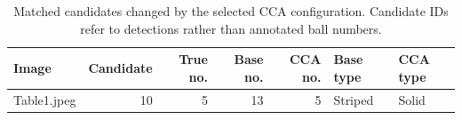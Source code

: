 \begin{table}[htbp]
\centering
\small
\caption{Matched candidates changed by the selected CCA configuration. Candidate IDs refer to detections rather than annotated ball numbers.}
\label{tab:cca-search-changes}
\begin{tabular}{lrrrrll}
\toprule
Image & Candidate & True no. & Base no. & CCA no. & Base type & CCA type \\
\midrule
Table1.jpeg & 10 & 5 & 13 & 5 & Striped & Solid \\
\bottomrule
\end{tabular}
\end{table}
\FloatBarrier
